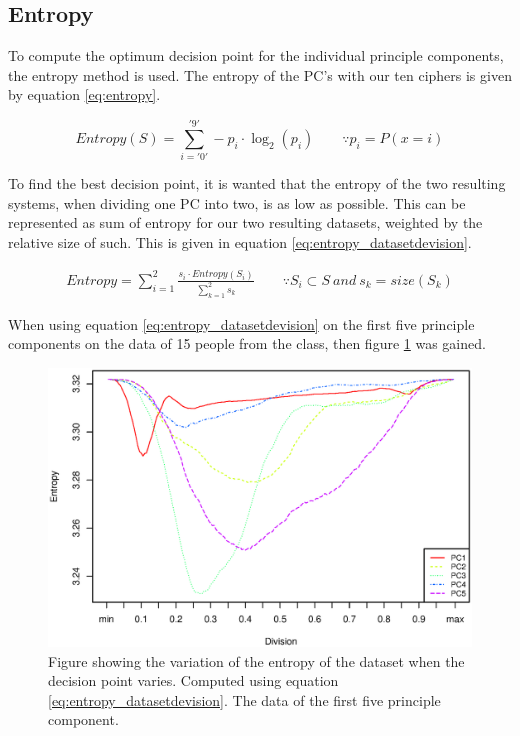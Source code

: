 \subsection{Entropy}
To compute the optimum decision point for the individual principle components, the entropy method is used.
The entropy of the PC's with our ten ciphers is given by equation \ref{eq:entropy}.

\begin{equation}
Entropy(S) = \sum_{i = '0'}^{'9'} -p_i \cdot \log_2(p_i) 
\qquad \because p_i = P(x = i)
\label{eq:entropy}
\end{equation}

To find the best decision point, it is wanted that the entropy of the two resulting systems, when dividing one PC into two, is as low as possible.
This can be represented as sum of entropy for our two resulting datasets, weighted by the relative size of such.
This is given in equation \ref{eq:entropy_datasetdevision}.

\begin{eqnarray}
Entropy = \sum_{i = 1}^{2} \frac{s_i \cdot Entropy(S_i)}{\sum_{k = 1}^{2} s_k} 
\qquad \because S_i \subset S\ and\ s_k = size(S_k)
\label{eq:entropy_datasetdevision}
\end{eqnarray}

When using equation \ref{eq:entropy_datasetdevision} on the first five principle components on the data of 15 people from the class, then figure \ref{fig:entropy_pc5} was gained.

\begin{figure}[H]
\centering
\includegraphics[width = 0.95 \textwidth]{graphics/entropy_pc}
\caption[Variation of the entropy]{Figure showing the variation of the entropy of the dataset when the decision point varies. Computed using equation \ref{eq:entropy_datasetdevision}. The data of the first five principle component.}
\label{fig:entropy_pc5}
\end{figure}



